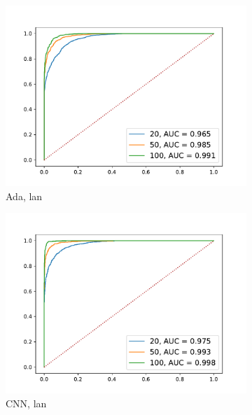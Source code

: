 \documentclass[12pt,a4paper,automark, toc=bib]{scrreprt}
\theoremstyle{definition}
\begin{document}
			\begin{figure}
				\begin{subfigure}{0.32\linewidth}
					\centering
					\includegraphics[width=\linewidth]{figures/md5_lan_AdaBoost.pdf}
					\caption{Ada, lan}
				\end{subfigure}
				\begin{subfigure}{0.32\linewidth}
					\centering
					\includegraphics[width=\linewidth]{figures/md5_lan_keras.pdf}
					\caption{CNN, lan}
				\end{subfigure}
				\begin{subfigure}{0.32\linewidth}
					\centering

\end{subfigure}
\end{figure}
\end{document}
